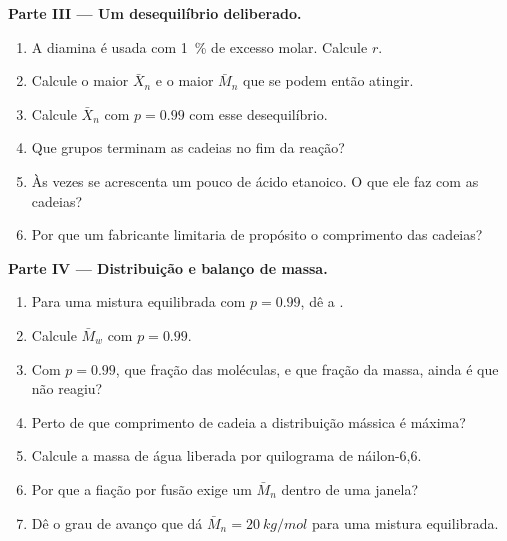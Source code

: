 \begin{problem}
\medskip
\noindent\textbf{Parte III --- Um desequilíbrio deliberado.}
\begin{enumerate}[resume]
  \item A diamina é usada com 1~\% de excesso molar. Calcule $r$.
  \item Calcule o maior $\bar X_n$ e o maior $\bar M_n$ que se podem então atingir.
  \item Calcule $\bar X_n$ com $p = 0.99$ com esse desequilíbrio.
  \item Que grupos terminam as cadeias no fim da reação?
  \item Às vezes se acrescenta um pouco de ácido etanoico. O que ele faz com as cadeias?
  \item Por que um fabricante limitaria de propósito o comprimento das cadeias?
\end{enumerate}

\medskip
\noindent\textbf{Parte IV --- Distribuição e balanço de massa.}
\begin{enumerate}[resume]
  \item Para uma mistura equilibrada com $p = 0.99$, dê a .
  \item Calcule $\bar M_w$ com $p = 0.99$.
  \item Com $p = 0.99$, que fração das moléculas, e que fração da massa, ainda é  que não
        reagiu?
  \item Perto de que comprimento de cadeia a distribuição mássica é máxima?
  \item Calcule a massa de água liberada por quilograma de náilon-6,6.
  \item Por que a fiação por fusão exige um $\bar M_n$ dentro de uma janela?
  \item Dê o grau de avanço que dá $\bar M_n = \qty{20}{kg/mol}$ para uma mistura equilibrada.
\end{enumerate}
\end{problem}
